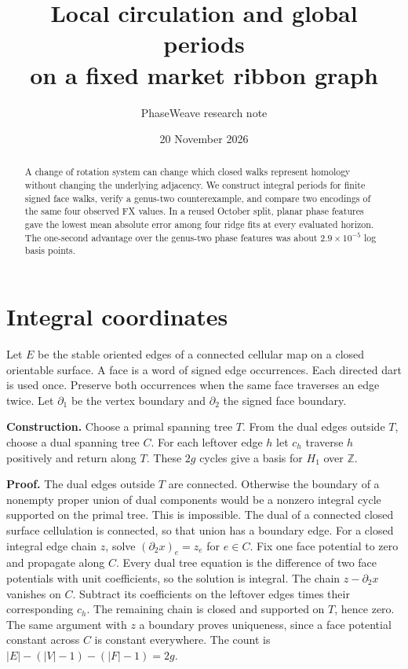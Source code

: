 \documentclass[11pt]{article}
\title{Local circulation and global periods\protect\\on a fixed market ribbon graph}
\author{PhaseWeave research note}
\date{20 November 2026}
\begin{document}
\maketitle
\begin{abstract}
A change of rotation system can change which closed walks represent homology without changing the underlying adjacency. We construct integral periods for finite signed face walks, verify a genus-two counterexample, and compare two encodings of the same four observed FX values. In a reused October split, planar phase features gave the lowest mean absolute error among four ridge fits at every evaluated horizon. The one-second advantage over the genus-two phase features was about $2.9\times10^{-5}$ log basis points.
\end{abstract}

\section{Integral coordinates}
Let $E$ be the stable oriented edges of a connected cellular map on a closed orientable surface. A face is a word of signed edge occurrences. Each directed dart is used once. Preserve both occurrences when the same face traverses an edge twice. Let $\partial_1$ be the vertex boundary and $\partial_2$ the signed face boundary.

\textbf{Construction.} Choose a primal spanning tree $T$. From the dual edges outside $T$, choose a dual spanning tree $C$. For each leftover edge $h$ let $c_h$ traverse $h$ positively and return along $T$. These $2g$ cycles give a basis for $H_1$ over $\mathbb Z$.

\textbf{Proof.} The dual edges outside $T$ are connected. Otherwise the boundary of a nonempty proper union of dual components would be a nonzero integral cycle supported on the primal tree. This is impossible. The dual of a connected closed surface cellulation is connected, so that union has a boundary edge. For a closed integral edge chain $z$, solve $(\partial_2 x)_e=z_e$ for $e\in C$. Fix one face potential to zero and propagate along $C$. Every dual tree equation is the difference of two face potentials with unit coefficients, so the solution is integral. The chain $z-\partial_2x$ vanishes on $C$. Subtract its coefficients on the leftover edges times their corresponding $c_h$. The remaining chain is closed and supported on $T$, hence zero. The same argument with $z$ a boundary proves uniqueness, since a face potential constant across $C$ is constant everywhere. The count is $|E|-(|V|-1)-(|F|-1)=2g$.
\end{document}
